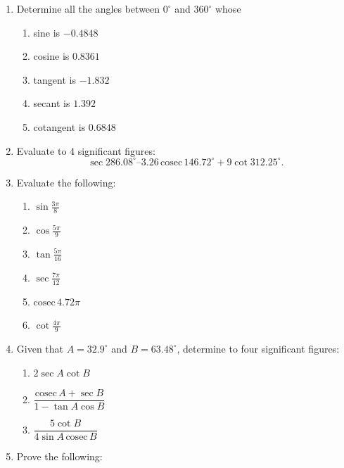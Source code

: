 \documentclass[
  english,
  12pt,
  oneside]{book}
\providecommand{\tightlist}{%
  \setlength{\itemsep}{0pt}\setlength{\parskip}{0pt}}
\theoremstyle{definition}
\theoremstyle{definition}
\theoremstyle{definition}
\theoremstyle{definition}
\theoremstyle{remark}
\begin{document}
\begin{enumerate}
\def\labelenumi{\arabic{enumi}.}
\item
  Determine all the angles between \(0^\circ\) and \(360^\circ\) whose

  \begin{enumerate}
  \def\labelenumii{\roman{enumii})}
  \tightlist
  \item
    sine is \(-0.4848\)
  \item
    cosine is \(0.8361\)
  \item
    tangent is \(-1.832\)
  \item
    secant is \(1.392\)
  \item
    cotangent is \(0.6848\)
  \end{enumerate}
\item
  Evaluate to 4 significant figures:
  \[\sec 286.08^\circ – 3.26 \,\mathrm{cosec}\, 146.72^\circ + 9 \cot 312.25^\circ.\]
\item
  Evaluate the following:

  \begin{enumerate}
  \def\labelenumii{\roman{enumii})}
  \tightlist
  \item
    \(\sin\frac{3\pi}{8}\)
  \item
    \(\cos\frac{5\pi}{9}\)
  \item
    \(\tan\frac{5\pi}{16}\)
  \item
    \(\sec\frac{7\pi}{12}\)
  \item
    \(\mathrm{cosec}\,4.72\pi\)
  \item
    \(\cot \frac{4\pi}{9}\)
  \end{enumerate}
\item
  Given that \(A=32.9^\circ\) and \(B=63.48^\circ\), determine to four significant figures:

  \begin{enumerate}
  \def\labelenumii{\roman{enumii})}
  \tightlist
  \item
    \(2\sec A\cot B\)
  \item
    \(\dfrac{\mathrm{cosec}\,A+\sec B}{1-\tan A\cos B}\)
  \item
    \(\dfrac{5\cot B}{4\sin A\,\mathrm{cosec}\, B}\)
  \end{enumerate}
\item
  Prove the following:


\end{enumerate}
\end{document}

